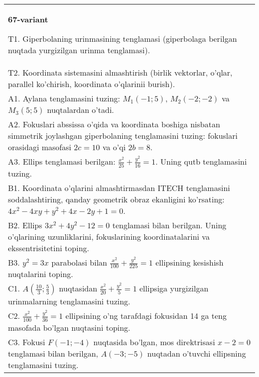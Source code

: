 \documentclass{article}
\begin{document}
\begin{tabular}{m{17cm}}
\textbf{67-variant}
\newline

T1. Giperbolaning urinmasining tenglamasi (giperbolaga berilgan nuqtada yurgizilgan urinma tenglamasi).\\

T2. Koordinata sistemasini almashtirish (birlik vektorlar, o'qlar, parallel ko'chirish, koordinata o'qlarinii burish).\\

A1. Aylana tenglamasini tuzing: $M_1(-1;5)$, $M_2(-2;-2)$ va $M_3(5;5)$ nuqtalardan o'tadi.\\

A2. Fokuslari abssissa o'qida va koordinata boshiga nisbatan simmetrik joylashgan giperbolaning tenglamasini tuzing: fokuslari orasidagi masofasi $2c=10$ va o'qi $2b=8$.\\

A3. Ellips tenglamasi berilgan: $\frac{x^2}{25}+\frac{y^2}{16}=1$. Uning qutb tenglamasini tuzing.\\

B1. Koordinata o'qlarini almashtirmasdan ITECH tenglamasini soddalashtiring, qanday geometrik obraz ekanligini ko'rsating: $4x^{2} - 4xy + y^{2} + 4x - 2y + 1 = 0$.  \\

B2. Ellips $3x^{2} + 4y^{2} - 12 = 0$ tenglamasi bilan berilgan. Uning o'qlarining uzunliklarini, fokuslarining koordinatalarini va ekssentrisitetini toping.  \\

B3. $y^{2} = 3x$ parabolasi bilan $\frac{x^{2}}{100} + \frac{y^{2}}{225} = 1$ ellipsining kesishish nuqtalarini toping.  \\

C1. $A(\frac{10}{3};\frac{5}{3})$ nuqtasidan $\frac{x^{2}}{20} + \frac{y^{2}}{5} = 1$ ellipsiga yurgizilgan urinmalarning tenglamasini tuzing.  \\

C2. $\frac{x^{2}}{100} + \frac{y^{2}}{36} = 1$ ellipsining o'ng tarafdagi fokusidan 14 ga teng masofada bo'lgan nuqtasini toping.  \\

C3. Fokusi $F( - 1; - 4)$ nuqtasida bo'lgan, mos direktrisasi $x - 2 = 0$ tenglamasi bilan berilgan, $A( - 3; - 5)$ nuqtadan o'tuvchi ellipsning tenglamasini tuzing.  \\

\end{tabular}
\vspace{1cm}
\end{document}
